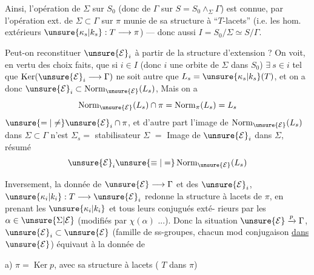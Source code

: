 Ainsi, l'opération de
$\Sigma$ sur $S_0$ (donc de $\Gamma$ sur $S=S_0\wedge_{\Sigma}\Gamma$)
est connue, par l'opération ext. de $\Sigma\subset\Gamma$ sur
$\pi$ munie de sa structure  à
``$T$-lacets'' (i.e. les hom. extérieurs
$\unsure{\kappa_s|k_s}:T\longrightarrow\pi$) --- donc aussi $I=S_0/\Sigma\simeq S/\Gamma$.

Peut-on reconstituer $\unsure{\mathcal E}_i$  à partir de la
structure d'extension ? On voit, 
en vertu des choix faits,
que si $i\in I$ (donc $i$ une orbite de
$\Sigma$ dans $S_0$) $\exists\ s\in i$ tel que $\operatorname{Ker}(\unsure{\mathcal E}_i\longrightarrow\Gamma)$
ne soit autre que $L_s=\unsure{\kappa_s|k_s}(T)$, et on a
donc $\unsure{\mathcal E}_i\subset\operatorname{Norm}_{\unsure{\mathcal E}}(L_s)$, Mais
on a
\[
\operatorname{Norm}_{\unsure{\mathcal E}}(L_s)\cap\pi
=\operatorname{Norm}_{\pi}(L_s)=L_s
\]
$\unsure{=|\ne}\unsure{\mathcal E}_i\cap\pi$, et d'autre part l'image de
$\operatorname{Norm}_{\unsure{\mathcal E}}(L_s)$ dans $\Sigma\subset\Gamma$ n'est  \inserted{$\unsure{\subset}$}
$\Sigma_s=$ stabilisateur   $\Sigma$
$=$ Image de $\unsure{\mathcal E}_i$ dans $\Sigma$,
  résumé
\[
\unsure{\mathcal E}_i\unsure{\equiv|=}\operatorname{Norm}_{\unsure{\mathcal E}}(L_s)
\]

Inversement, la donnée de $\unsure{\mathcal E}\longrightarrow\Gamma$
et des $\unsure{\mathcal E}_i$, $\unsure{\kappa_i|k_i}:T\longrightarrow\unsure{\mathcal E}_i$ redonne la
structure à lacets de $\pi$, en prenant
les $\unsure{\kappa_i|k_i}$ et tous leurs conjugués exté-
rieurs  par les $\alpha\in\unsure{\Sigma|\mathcal E}$ (modifiés par $\chi(\alpha)$ ...).
Donc la  situation $\unsure{\mathcal E}\xrightarrow{p}\Gamma$, $\unsure{\mathcal E}_i\subset\unsure{\mathcal E}$
 (famille de ss-groupes, chacun
 mod conjugaison \uline{dans $\unsure{\mathcal E}$}) équivaut
à la donnée de

a) $\pi=\operatorname{Ker}p$, avec sa structure à lacets
(
$T$ dans $\pi$)

